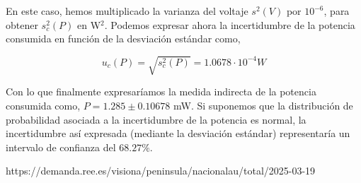 En este caso, hemos multiplicado la varianza del voltaje $s^2(V)$ por $10^{-6}$, para obtener $s_c^2(P)$ en W$^2$. Podemos expresar ahora la incertidumbre de la potencia consumida en función de la desviación estándar como,

\begin{equation*}
u_c(P) = \sqrt{s_c^2(P)} =  1.0678\cdot 10^{-4} W
\end{equation*}

Con lo que finalmente expresaríamos la medida indirecta de la potencia consumida como, $P = 1.285 \pm 0.10678 $ mW. Si suponemos que la distribución de probabilidad asociada a la incertidumbre de la potencia es normal, la incertidumbre así expresada (mediante la desviación estándar) representaría un intervalo de confianza del $68.27\%$. 

https://demanda.ree.es/visiona/peninsula/nacionalau/total/2025-03-19